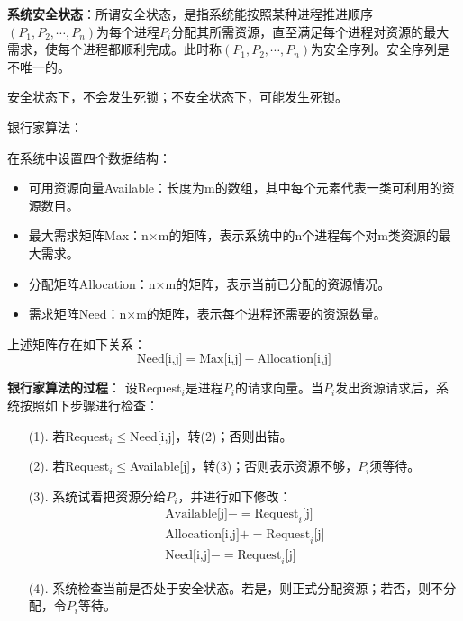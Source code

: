 \documentclass[12pt, a4paper, oneside]{ctexart}
\begin{document}
\textbf{系统安全状态}：所谓安全状态，是指系统能按照某种进程推进顺序$(P_1,P_2,\cdots,P_n)$为每个进程$P_i$分配其所需资源，直至满足每个进程对资源的最大需求，使每个进程都顺利完成。此时称$(P_1,P_2,\cdots,P_n)$为安全序列。安全序列是不唯一的。

安全状态下，不会发生死锁；不安全状态下，可能发生死锁。

\vspace*{10pt}

银行家算法：

在系统中设置四个数据结构：
\begin{itemize}
  \item 可用资源向量Available：长度为m的数组，其中每个元素代表一类可利用的资源数目。
  \item 最大需求矩阵Max：n$\times$m的矩阵，表示系统中的n个进程每个对m类资源的最大需求。
  \item 分配矩阵Allocation：n$\times$m的矩阵，表示当前已分配的资源情况。
  \item 需求矩阵Need：n$\times$m的矩阵，表示每个进程还需要的资源数量。
\end{itemize}

上述矩阵存在如下关系：
\begin{equation*}
    \text{Need[i,j]}=\text{Max[i,j]}-\text{Allocation[i,j]}
\end{equation*}

\vspace{10pt}

\textbf{银行家算法的过程}：
设Request$_i$是进程$P_i$的请求向量。当$P_i$发出资源请求后，系统按照如下步骤进行检查：

\begin{enumerate}
  \item [(1). ] 若Request$_i\leq$Need[i,j]，转(2)；否则出错。
  \item [(2). ] 若Request$_i\leq$Available[j]，转(3)；否则表示资源不够，$P_i$须等待。
  \item [(3). ] 系统试着把资源分给$P_i$，并进行如下修改：
  \begin{gather*}
    \text{Available[j]}-=\text{Request}_i\text{[j]}\\
    \text{Allocation[i,j]}+=\text{Request}_i\text{[j]}\\
    \text{Need[i,j]}-=\text{Request}_i\text{[j]}
  \end{gather*}
  \item [(4). ] 系统检查当前是否处于安全状态。若是，则正式分配资源；若否，则不分配，令$P_i$等待。
\end{enumerate}
\end{document}
